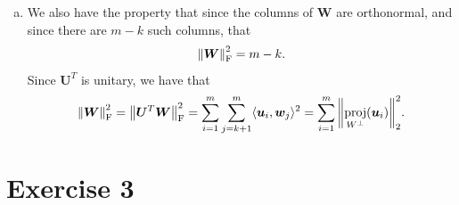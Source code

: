 \documentclass[article, a4paper, oneside, 12pt]{memoir}
\DeclareMathOperator{\proj}{proj}
\newcommand{\mat}[1]{\bm{#1}}
\newcommand{\frob}[1]{\norm{#1}_{\mathrm{F}}}
\begin{document}
\begin{enumerate}[a)]
\item We also have the property that since the columns of \( \mat{W} \) are
    orthonormal, and since there are \( m - k \) such columns, that 
\begin{equation}
    \frob{\mat{W}}^2 = m - k.
\end{equation}
Since \( \mat{U}^T \) is unitary, we have that
\begin{align}
    \frob{\mat{W}}^2 = \frob{\mat{U}^T\mat{W}}^2 = \sum_{i=1}^m \sum_{j=k+1}^m \langle \mat{u}_i, \mat{w}_j \rangle^2 = \sum_{i=1}^m \norm{\proj_{W^\perp}(\mat{u}_i)}^2_2.
\end{align}
\end{enumerate}
\chapter*{Exercise 3}
\end{document}
